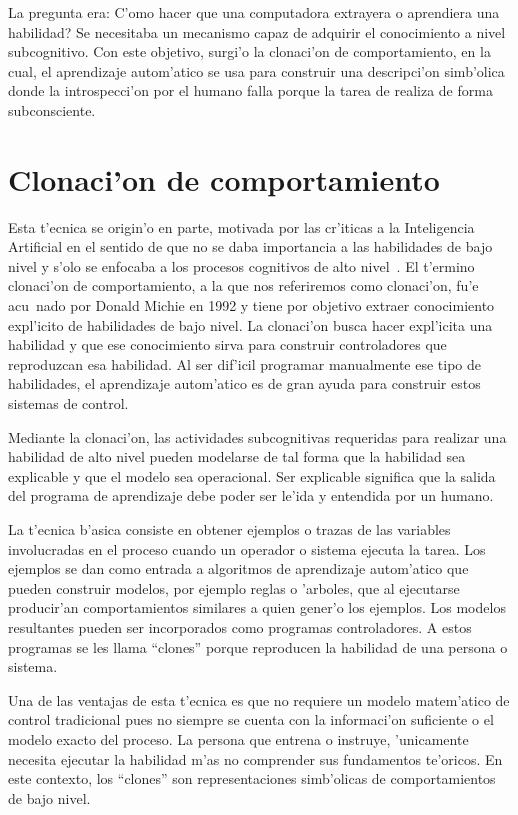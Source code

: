 \documentclass[11pt]{article}
\begin{document}
La pregunta era: \medskip \textquestiondown C'omo hacer que una computadora extrayera o aprendiera una habilidad? Se necesitaba un mecanismo capaz de adquirir el conocimiento a nivel subcognitivo. Con este objetivo, surgi'o la clonaci'on de comportamiento, en la cual, el aprendizaje autom'atico se usa para construir una descripci'on simb'olica donde la introspecci'on por el humano falla porque la tarea de realiza de forma subconsciente. 

\section {Clonaci'on de comportamiento}

Esta t'ecnica se origin'o en parte, motivada por las cr'iticas a la Inteligencia Artificial en el sentido de que no se daba importancia a las habilidades de bajo nivel y s'olo se enfocaba a los procesos cognitivos de alto nivel~\cite{michiesammut:cloning}. El t'ermino \textsf{clonaci'on de comportamiento}, a la que nos referiremos como \textsf{clonaci'on}, fu'e acu~nado por Donald Michie en 1992 y tiene por objetivo extraer conocimiento expl'icito de habilidades de bajo nivel. La \textsf{clonaci'on} busca hacer expl'icita una habilidad y que ese conocimiento sirva para construir controladores que reproduzcan esa habilidad. Al ser dif'icil programar manualmente ese tipo de habilidades, el aprendizaje autom'atico es de gran ayuda para construir estos sistemas de control.

Mediante la clonaci'on, las actividades subcognitivas requeridas para realizar una habilidad de alto nivel pueden modelarse de tal forma que la habilidad sea explicable y que el modelo sea operacional. Ser explicable significa que la salida del programa de aprendizaje debe poder ser le'ida y entendida por un humano.

La t'ecnica b'asica consiste en obtener ejemplos o trazas de las variables involucradas en el proceso cuando un operador o sistema ejecuta la tarea. Los ejemplos se dan como entrada a algoritmos de aprendizaje autom'atico que pueden construir modelos, por ejemplo reglas o 'arboles, que al ejecutarse producir'an comportamientos similares a quien gener'o los ejemplos. Los modelos resultantes pueden ser incorporados como programas controladores. A estos programas se les llama ``clones'' porque reproducen la habilidad de una persona o sistema.

Una de las ventajas de esta t'ecnica es que no requiere un modelo matem'atico de control tradicional pues no siempre se cuenta con la informaci'on suficiente o el modelo exacto del proceso. La persona que entrena o instruye, 'unicamente necesita ejecutar la habilidad m'as no comprender sus fundamentos te'oricos. En este contexto, los ``clones'' son representaciones simb'olicas de comportamientos de bajo nivel. 
\end{document}
